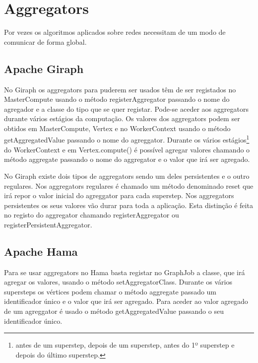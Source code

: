\newpage

\section*{Aggregators}
  Por vezes os algoritmos aplicados sobre redes necessitam de um modo de comunicar de forma global. 
  \subsection*{Apache Giraph}
    No Giraph os aggregators para puderem ser usados têm de ser registados no MasterCompute usando o método registerAggregator
    passando o nome do agregador e a classe do tipo que se quer registar. Pode-se aceder aos aggregators durante vários estágios da computação.
    Os valores dos aggregators podem ser obtidos em MasterCompute, Vertex e no WorkerContext usando o método getAggregatedValue passando
    o nome do agreggator.
    Durante os vários estágios\footnote{antes de um superstep, depois de um superstep, 
    antes do 1º superstep e depois do último superstep.} do WorkerContext e em Vertex.compute() é possível agregar valores chamando o método
    aggregate passando o nome do aggregator e o valor que irá ser agregado.
    
    No Giraph existe dois tipos de aggregators sendo um deles persistentes e o outro regulares. Nos aggregators regulares é chamado um método
    denominado reset que irá repor o valor inicial do agreggator para cada superstep. Nos aggregators persistentes os seus valores vão durar
    para toda a aplicação. Esta distinção é feita no registo do aggregator chamando registerAggregator 
    ou registerPersistentAggregator.
    
  \subsection*{Apache Hama}
    Para se usar aggregators no Hama basta registar no GraphJob a classe, que irá agregar os valores, usando o método
    setAggregatorClass. Durante os vários supersteps os vértices podem chamar o método aggregate passado um identificador único
    e o valor que irá ser agregado. Para aceder ao valor agregado de um agreggator é usado o método getAggregatedValue passando o seu 
    identificador único.
    
